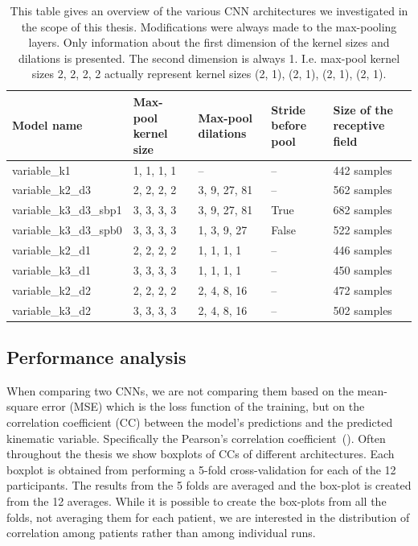 \begin{table}[!htpb]
\centering
\begin{tabular}{|p{3.7cm}|p{1.7cm}|p{2cm}|p{1.2cm}|p{2.5cm}|}
\toprule
Model name & Max-pool kernel size & Max-pool dilations & Stride before pool & Size of the receptive field \\
\midrule
variable\_k1 & 1, 1, 1, 1 & -- & -- & 442 samples \\
\hline
variable\_k2\_d3 & 2, 2, 2, 2 & 3, 9, 27, 81 & -- & 562 samples \\
\hline
variable\_k3\_d3\_sbp1 & 3, 3, 3, 3 & 3, 9, 27, 81 & True & 682 samples \\
\hline
variable\_k3\_d3\_spb0 & 3, 3, 3, 3  & 1, 3, 9, 27 & False & 522 samples \\
\hline
variable\_k2\_d1 & 2, 2, 2, 2 & 1, 1, 1, 1 & -- & 446 samples \\
\hline
variable\_k3\_d1 & 3, 3, 3, 3  & 1, 1, 1, 1 & -- & 450 samples \\
\hline
variable\_k2\_d2 & 2, 2, 2, 2 & 2, 4, 8, 16 & -- & 472 samples \\
\hline
variable\_k3\_d2 & 3, 3, 3, 3 & 2, 4, 8, 16 & -- & 502 samples \\
\hline
\bottomrule
\end{tabular}
\caption[Architectural modifications]{This table gives an overview of the various CNN architectures we investigated in the scope of this thesis.
Modifications were always made to the max-pooling layers.
Only information about the first dimension of the kernel sizes and dilations is presented.
The second dimension is always 1.
I.e. max-pool kernel sizes 2, 2, 2, 2 actually represent kernel sizes (2, 1), (2, 1), (2, 1), (2, 1). }
\label{tab:architectures-description}
\end{table}

\subsection{Performance analysis}\label{subsec:performance-analysis}
When comparing two CNNs, we are not comparing them based on the mean-square error (MSE) which is the loss function of the training, but on the correlation coefficient (CC) between the model's predictions and the predicted kinematic variable.
Specifically the Pearson's correlation coefficient~(\cite{pearson-vii-1895}).
Often throughout the thesis we show boxplots of CCs of different architectures.
Each boxplot is obtained from performing a 5-fold cross-validation for each of the 12 participants.
The results from the 5 folds are averaged and the box-plot is created from the 12 averages.
While it is possible to create the box-plots from all the folds, not averaging them for each patient, we are interested in the distribution of correlation among patients rather than among individual runs.